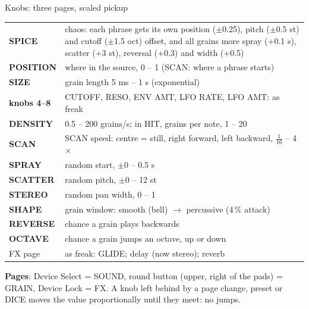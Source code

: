 \documentclass{article}
\newcommand{\FX}[1]{\textcolor{fxc}{#1}}
\newcommand{\GR}[1]{\textcolor{grc}{#1}}
\begin{document}
\vspace{1.2mm}
\begin{minipage}[t]{76mm}\vspace{0pt}
\begin{card}{Knobs: three pages, scaled pickup}
\fontsize{6.8}{8.1}\selectfont
\begin{tabularx}{\linewidth}{@{}l L@{}}
\textbf{SPICE} & chaos: each phrase gets its own position (\(\pm\)0.25), pitch (\(\pm\)0.5 st) and cutoff (\(\pm\)1.5 oct)
offset, and all grains more spray (+0.1 s), scatter (+3 st), reversal (+0.3) and width (+0.5) \\
\textbf{POSITION} & where in the source, 0 -- 1 (SCAN: where a phrase starts) \\
\textbf{SIZE} & grain length 5 ms -- 1 s (exponential) \\
\textbf{knobs 4--8} & \textcolor{fltc}{CUTOFF}, \textcolor{fltc}{RESO}, \textcolor{modc}{ENV AMT}, \textcolor{lfoc}{LFO RATE}, \textcolor{lfoc}{LFO AMT}: as freak \\[0.5mm]
\GR{\textbf{DENSITY}} & 0.5 -- 200 grains/s; in HIT, grains per note, 1 -- 20 \\
\GR{\textbf{SCAN}} & SCAN speed: centre = still, right forward, left backward, \(\frac1{16}\) -- 4\(\times\) \\
\GR{\textbf{SPRAY}} & random start, \(\pm\)0 -- 0.5 s \\
\GR{\textbf{SCATTER}} & random pitch, \(\pm\)0 -- 12 st \\
\GR{\textbf{STEREO}} & random pan width, 0 -- 1 \\
\GR{\textbf{SHAPE}} & grain window: smooth (bell) \(\to\) percussive (4\,\% attack) \\
\GR{\textbf{REVERSE}} & chance a grain plays backwards \\
\GR{\textbf{OCTAVE}} & chance a grain jumps an octave, up or down \\[0.5mm]
\FX{FX page} & as freak: GLIDE; delay (now stereo); reverb \\
\end{tabularx}
\vspace{0.4mm}
\textbf{Pages}: Device Select = SOUND, round button (upper, right of the pads) = \GR{GRAIN}, Device Lock = FX.
A knob left behind by a page change, preset or DICE moves the value proportionally until they meet: no jumps.
\end{card}
\end{minipage}\hfill
\end{document}
